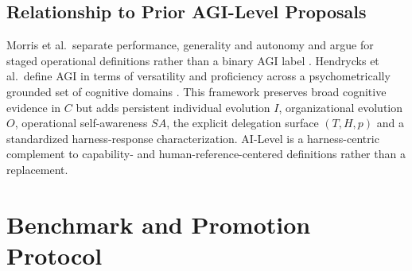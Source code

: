 \documentclass[11pt]{article}
\theoremstyle{definition}
\begin{document}
\subsection{Relationship to Prior AGI-Level Proposals}

Morris et al.\ separate performance, generality and autonomy and argue for staged operational definitions rather than a binary AGI label \citep{morris2024levels}. Hendrycks et al.\ define AGI in terms of versatility and proficiency across a psychometrically grounded set of cognitive domains \citep{hendrycks2025agi}. This framework preserves broad cognitive evidence in $C$ but adds persistent individual evolution $I$, organizational evolution $O$, operational self-awareness $SA$, the explicit delegation surface $(T,H,p)$ and a standardized harness-response characterization. AI-Level is a harness-centric complement to capability- and human-reference-centered definitions rather than a replacement.

\section{Benchmark and Promotion Protocol}\label{sec:protocol}
\end{document}
